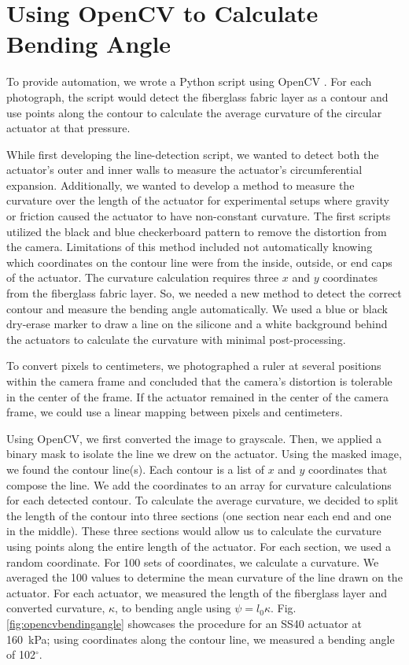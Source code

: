\section{Using OpenCV to Calculate Bending Angle}
\label{section:opencv}

To provide automation, we wrote a Python script using OpenCV \cite{opencv_library}. For each photograph, the script would detect the fiberglass fabric layer as a contour and use points along the contour to calculate the average curvature of the circular actuator at that pressure. 

While first developing the line-detection script, we wanted to detect both the actuator's outer and inner walls to measure the actuator's circumferential expansion. Additionally, we wanted to develop a method to measure the curvature over the length of the actuator for experimental setups where gravity or friction caused the actuator to have non-constant curvature. The first scripts utilized the black and blue checkerboard pattern to remove the distortion from the camera. Limitations of this method included not automatically knowing which coordinates on the contour line were from the inside, outside, or end caps of the actuator. The curvature calculation requires three $x$ and $y$ coordinates from the fiberglass fabric layer. So, we needed a new method to detect the correct contour and measure the bending angle automatically. We used a blue or black dry-erase marker to draw a line on the silicone and a white background behind the actuators to calculate the curvature with minimal post-processing. 

To convert pixels to centimeters, we photographed a ruler at several positions within the camera frame and concluded that the camera's distortion is tolerable in the center of the frame. If the actuator remained in the center of the camera frame, we could use a linear mapping between pixels and centimeters. 

Using OpenCV, we first converted the image to grayscale. Then, we applied a binary mask to isolate the line we drew on the actuator. Using the masked image, we found the contour line(s). Each contour is a list of $x$ and $y$ coordinates that compose the line. We add the coordinates to an array for curvature calculations for each detected contour. To calculate the average curvature, we decided to split the length of the contour into three sections (one section near each end and one in the middle). These three sections would allow us to calculate the curvature using points along the entire length of the actuator. For each section, we used a random coordinate. For 100 sets of coordinates, we calculate a curvature. We averaged the 100 values to determine the mean curvature of the line drawn on the actuator. For each actuator, we measured the length of the fiberglass layer and converted curvature, $\kappa$, to bending angle using $\psi = l_{0}\kappa$. Fig. \ref{fig:opencvbendingangle} showcases the procedure for an SS40 actuator at 160~kPa; using coordinates along the contour line, we measured a bending angle of 102$^\circ$. 

